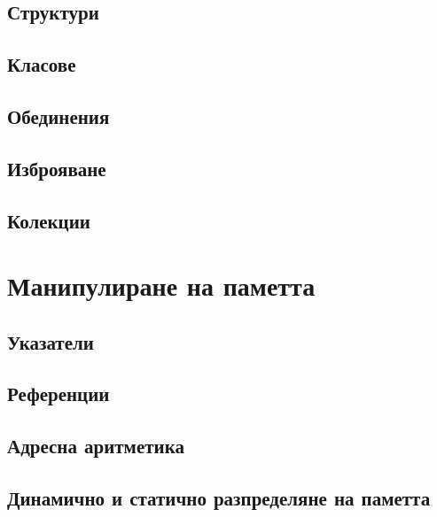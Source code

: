 \documentclass[oneside]{book}
\begin{document}
\section{Структури}
\section{Класове}
\section{Обединения}
\section{Изброяване}
\section{Колекции}

\chapter{Манипулиране на паметта}
\section{Указатели}
\section{Референции}
\section{Адресна аритметика}
\section{Динамично и статично разпределяне на паметта}
\end{document}
